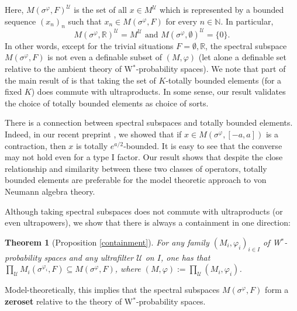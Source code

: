 \documentclass[12pt]{amsart}
\newtheorem*{thm*}{Theorem}
\theoremstyle{definition}
\newcommand{\N}{\mathbb{N}}
\def\bb{\mathbb}
\def\bb{\mathbb}
\def\cal{\mathcal}
\def\u{\mathsf 1}
\newcommand\cU{{\cal U}}
\def \u{\mathcal U}
\begin{document}
Here, $M(\sigma^{\varphi},F)^{\mathcal{U}}$ is the set of all $x\in M^{\mathcal{U}}$ which is represented by a bounded sequence $(x_n)_n$ such that $x_n\in M(\sigma^{\varphi},F)$ for every $n\in \N$. In particular, $$M(\sigma^{\varphi},\mathbb{R})^{\cU}=M^{\mathcal{U}} \text{ and }M(\sigma^{\varphi},\emptyset)^{\cU}=\{0\}.$$ 
In other words, except for the trivial situations $F=\emptyset, \bb R$, the spectral subspace $M(\sigma^\varphi,F)$ is not even a definable subset of $(M,\varphi)$ (let alone a definable set relative to the ambient theory of W$^*$-probability spaces).  We note that part of the main result of \cite{AGHS25} is that taking the set of $K$-totally bounded elements (for a fixed $K$) does commute with ultraproducts.  In some sense, our result validates the choice of totally bounded elements as choice of sorts. 

There is a connection between spectral subspaces and totally bounded elements.  Indeed, in our recent preprint \cite{AG2026_bicentralizer}, we showed that if $x\in M(\sigma^\varphi,[-a,a])$ is a contraction, then $x$ is totally $e^{a/2}$-bounded.  It is easy to see that the converse may not hold even for a type I factor. Our result shows that despite the close relationship and similarity between these two classes of operators, totally bounded elements are preferable for the model theoretic approach to von Neumann algebra theory.

Although taking spectral subspaces does not commute with ultraproducts (or even ultrapowers), we show that there is always a containment in one direction:

\begin{thm*}[Proposition \ref{containment}]
For any family $(M_i,\varphi_i)_{i\in I}$ of W$^*$-probability spaces and any ultrafilter $\u$ on $I$, one has that $\prod_\u M_i(\sigma^{\varphi_i},F)\subseteq M(\sigma^\varphi,F)$, where $(M,\varphi):=\prod_\u (M_i,\varphi_i)$.
\end{thm*}

Model-theoretically, this implies that the spectral subspaces $M(\sigma^\varphi,F)$ form a \textbf{zeroset} relative to the theory of W$^*$-probability spaces.
\end{document}
